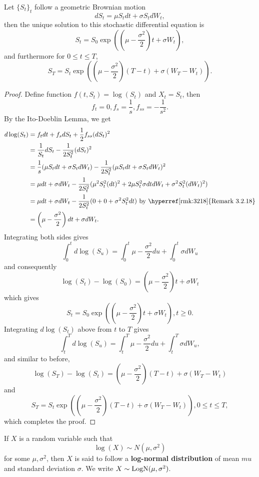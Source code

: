 \documentclass[11pt,fleqn]{book} %
\begin{document}
\begin{theorem} \label{thm:346}
Let \(\{S_t\}_t\) follow a geometric Brownian motion
\[
dS_t = \mu S_tdt + \sigma S_t dW_t,
\]
then the unique solution to this stochastic differential equation is
\[
S_t = S_0\exp\left(\left(\mu - \frac{\sigma^2}{2}\right)t + \sigma W_t\right),
\]
and furthermore for \(0 \leq t \leq T\),
\[
S_T = S_t\exp\left(\left(\mu - \frac{\sigma^2}{2}\right)(T - t) + \sigma(W_T - W_t)\right).
\]
\end{theorem}
\begin{proof}
Define function \(f(t, S_t) = \log(S_t)\) and \(X_t = S_t\), then
\[
f_t = 0, f_s = \frac1s, f_{ss} = -\frac{1}{s^2}.
\]
\indent By the Ito-Doeblin Lemma, we get
\[
\begin{aligned}
d\log(S_t) &= f_tdt + f_sdS_t + \frac12 f_{ss}(dS_t)^2 \\
&= \frac{1}{S_t}dS_t - \frac{1}{2S_t^2}(dS_t)^2 \\
&= \frac1s(\mu S_tdt + \sigma S_tdW_t) - \frac{1}{2S_t^2}(\mu S_tdt + \sigma S_t dW_t)^2 \\
&= \mu dt + \sigma dW_t - \frac{1}{2S_t^2}(\mu^2S_t^2(dt)^2 + 2\mu S_t^2\sigma dtdW_t + \sigma^2S_t^2(dW_t)^2) \\
&= \mu dt + \sigma dW_t - \frac{1}{2S_t^2}(0 + 0 + \sigma^2S_t^2dt) \text{ by \hyperref[rmk:3218]{Remark 3.2.18}} \\
&= \left(\mu - \frac{\sigma^2}{2}\right)dt + \sigma dW_t.
\end{aligned}
\]
\indent Integrating both sides gives
\[
\int_0^t d\log(S_u) = \int_0^t\mu - \frac{\sigma^2}{2} du + \int_0^t \sigma dW_u
\]
and consequently
\[
\log(S_t) - \log(S_0) = \left(\mu - \frac{\sigma^2}{2}\right)t + \sigma W_t
\]
which gives
\[
S_t = S_0\exp\left(\left(\mu - \frac{\sigma^2}{2}\right)t + \sigma W_t\right), t \geq 0.
\]
\indent Integrating \(d\log(S_t)\) above from \(t\) to \(T\) gives
\[
\int_t^T d\log(S_u) = \int_t^T\mu - \frac{\sigma^2}{2} du + \int_t^T \sigma dW_u,
\]
and similar to before,
\[
\log(S_T) - \log(S_t) = \left(\mu - \frac{\sigma^2}{2}\right)(T - t) + \sigma(W_T - W_t)
\]
and
\[
S_T = S_t\exp\left(\left(\mu - \frac{\sigma^2}{2}\right)(T - t) + \sigma(W_T - W_t)\right), 0 \leq t \leq T,
\]
which completes the proof.
\end{proof}

\begin{definition} \label{def:347}
If \(X\) is a random variable such that 
\[
\log(X) \sim N(\mu, \sigma^2)
\]
for some \(\mu, \sigma^2\), then \(X\) is said to follow a \textbf{log-normal distribution} of mean \(mu\) and standard deviation \(\sigma\). We write \(X \sim \operatorname{LogN}(\mu, \sigma^2)\).
\end{definition}
\end{document}
